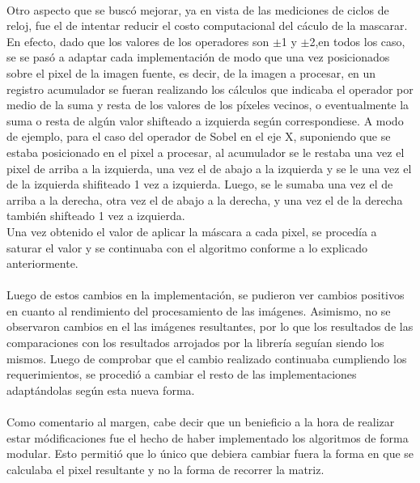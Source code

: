 \documentclass[11pt, a4paper]{article}
\begin{document}
\paragraph{}
Otro aspecto que se busc\'o mejorar, ya en vista de las mediciones de ciclos de reloj, fue el de intentar reducir el costo computacional del c\'aculo de la mascarar. En efecto, dado que los valores de los operadores son $\pm$1 y $\pm$2,en todos los caso, se se pas\'o a adaptar cada implementaci\'on de modo que una vez posicionados sobre el pixel de la imagen fuente, es decir, de la imagen a procesar, en un registro acumulador se fueran realizando los c\'alculos que indicaba el operador por medio de la suma y resta de los valores de los p\'ixeles vecinos, o eventualmente la suma o resta de alg\'un valor shifteado a izquierda seg\'un correspondiese.
A modo de ejemplo, para el caso del operador de Sobel en el eje X, suponiendo que se estaba posicionado en el pixel a procesar, al acumulador se le restaba una vez el pixel de arriba a la izquierda, una vez el de abajo a la izquierda y se le una vez el de la izquierda shifiteado 1 vez a izquierda. Luego, se le sumaba una vez el de arriba a la derecha, otra vez el de abajo a la derecha, y una vez el de la derecha tambi\'en shifteado 1 vez a izquierda.\\
Una vez obtenido el valor de aplicar la m\'ascara a cada pixel, se proced\'ia a saturar el valor y se continuaba con el algoritmo conforme a lo explicado anteriormente.

\paragraph{}
Luego de estos cambios en la implementaci\'on, se pudieron ver cambios positivos en cuanto al rendimiento del procesamiento de las im\'agenes. Asimismo, no se observaron cambios en el las im\'agenes resultantes, por lo que los resultados de las comparaciones con los resultados arrojados por la librer\'ia segu\'ian siendo los mismos.
Luego de comprobar que el cambio realizado continuaba cumpliendo los requerimientos, se procedi\'o a cambiar el resto de las implementaciones adapt\'andolas seg\'un esta nueva forma.

\paragraph*{}
Como comentario al margen, cabe decir que un benieficio a la hora de realizar estar m\'odificaciones fue el hecho de haber implementado los algoritmos de forma modular. Esto permiti\'o que lo \'unico que debiera cambiar fuera la forma en que se calculaba el pixel resultante y no la forma de recorrer la matriz.
\end{document}
